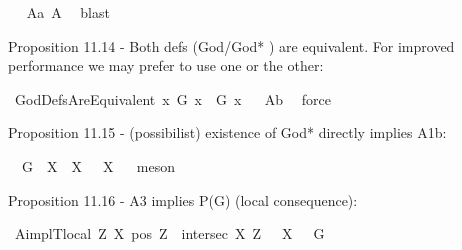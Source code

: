 \begin{isabellebody}
\isadelimproof
\ %
\endisadelimproof
%
\isatagproof
{}\isamarkupfalse%
\ A{}a\ A{}\ \isamarkupfalse%
\ blast%
\endisatagproof
{\isafoldproof}%
%
\isadelimproof
%
\endisadelimproof
%
\begin{isamarkuptext}%
Proposition 11.14 - Both defs (God/God* ) are equivalent. For improved performance we may prefer to use one or the other:%
\end{isamarkuptext}\isamarkuptrue%
\isamarkupfalse%
\ GodDefsAreEquivalent{\isacharcolon}\ {\isachardoublequoteopen}{\isasymlfloor}\isactrlbold {\isasymforall}x{\isachardot}\ G\ x\ \isactrlbold {\isasymleftrightarrow}\ G{\isacharasterisk}\ x{\isasymrfloor}{\isachardoublequoteclose}%
\isadelimproof
\ %
\endisadelimproof
%
\isatagproof
{}\isamarkupfalse%
\ A{}b\ \isamarkupfalse%
\ force%
\endisatagproof
{\isafoldproof}%
%
\isadelimproof
%
\endisadelimproof
%
\begin{isamarkuptext}%
Proposition 11.15 - (possibilist) existence of God* directly implies A1b:%
\end{isamarkuptext}\isamarkuptrue%
\isamarkupfalse%
\ {\isachardoublequoteopen}{\isasymlfloor}\isactrlbold {\isasymexists}\ G{\isacharasterisk}\ \isactrlbold {\isasymrightarrow}\ {\isacharparenleft}\isactrlbold {\isasymforall}X{\isachardot}\ \isactrlbold {\isasymnot}{\isacharparenleft}{\isasymP}\ X{\isacharparenright}\ \isactrlbold {\isasymrightarrow}\ {\isasymP}\ {\isacharparenleft}\isactrlbold {\isasymrightharpoondown}X{\isacharparenright}{\isacharparenright}{\isasymrfloor}{\isachardoublequoteclose}%
\isadelimproof
\ %
\endisadelimproof
%
\isatagproof
{}\isamarkupfalse%
\ meson%
\endisatagproof
{\isafoldproof}%
%
\isadelimproof
%
\endisadelimproof
%
\begin{isamarkuptext}%
Proposition 11.16 - A3 implies P(G) (local consequence):%
\end{isamarkuptext}\isamarkuptrue%
\isamarkupfalse%
\ A{}implT{}{\isacharunderscore}local{\isacharcolon}\ {\isachardoublequoteopen}{\isasymlfloor}{\isacharparenleft}\isactrlbold {\isasymforall}Z\ X{\isachardot}\ {\isacharparenleft}pos\ Z\ \isactrlbold {\isasymand}\ intersec\ X\ Z{\isacharparenright}\ \isactrlbold {\isasymrightarrow}\ {\isasymP}\ X{\isacharparenright}\ \isactrlbold {\isasymrightarrow}\ {\isasymP}\ G{\isasymrfloor}{\isachardoublequoteclose}\isanewline
%
\isadelimproof
%
\endisadelimproof
%
\isatagproof
{}\isamarkupfalse%

\end{isabellebody}
